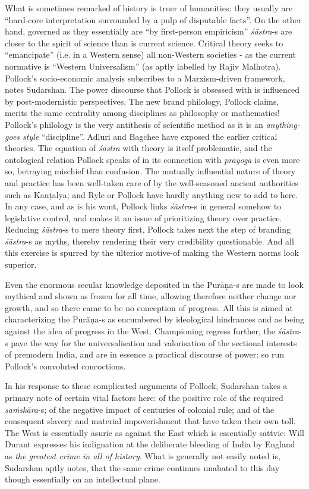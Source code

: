 What is sometimes remarked of history is truer of humanities: they usually are “hard-core interpretation surrounded by a pulp of disputable facts”. On the other hand, governed as they essentially are “by first-person empiricism” {\sl śāstra}-s are closer to the spirit of science than is current science. Critical theory seeks to “emancipate” (i.e. in a Western sense) all non-Western societies - as the current normative is “Western Universalism” (as aptly labelled by Rajiv Malhotra). Pollock’s socio-economic analysis subscribes to a Marxism-driven framework, notes Sudarshan. The power discourse that Pollock is obsessed with is influenced by post-modernistic perspectives. The new brand philology, Pollock claims, merits the same centrality among disciplines as philosophy or mathematics! Pollock’s philology is the very antithesis of scientific method as it is an {\sl anything-goes style} “discipline”. Adluri and Bagchee have exposed the earlier critical theories. The equation of {\sl śāstra} with theory is itself problematic, and the ontological relation Pollock speaks of in its connection with {\sl prayoga} is even more so, betraying mischief than confusion. The mutually influential nature of theory and practice has been well-taken care of by the well-seasoned ancient authorities such as Kauṭalya; and Ryle or Pollock have hardly anything new to add to here. In any case, and as is his wont, Pollock links {\sl śāstra}-s in general somehow to legislative control, and makes it an issue of prioritizing theory over practice. Reducing {\sl śāstra}-s to mere theory first, Pollock takes next the step of branding {\sl śāstra}-s as myths, thereby rendering their very credibility questionable. And all this exercise is spurred by the ulterior motive-of making the Western norms look superior.

Even the enormous secular knowledge deposited in the Purāṇa-s are made to look mythical and shown as frozen for all time, allowing therefore neither change nor growth, and so there came to be no conception of progress. All this is aimed at characterizing the \hbox{Purāṇa-s} as encumbered by ideological hindrances and as being against the idea of progress in the West. Championing regress further, the {\sl śāstra}-s pave the way for the universalisation and valorisation of the sectional interests of premodern India, and are in essence a practical discourse of power: so run Pollock’s convoluted concoctions.

In his response to these complicated arguments of Pollock, Sudarshan takes a primary note of certain vital factors here: of the positive role of the required {\sl saṁskāra}-s; of the negative impact of centuries of colonial rule; and of the consequent slavery and material impoverishment that have taken their own toll. The West is essentially āsuric as against the East which is essentially sāttvic: Will Durant expresses his indignation at the deliberate bleeding of India by England as {\sl the greatest crime in all of history}. What is generally not easily noted is, Sudarshan aptly notes, that the same crime continues unabated to this day though essentially on an intellectual plane.
\vskip 8pt

